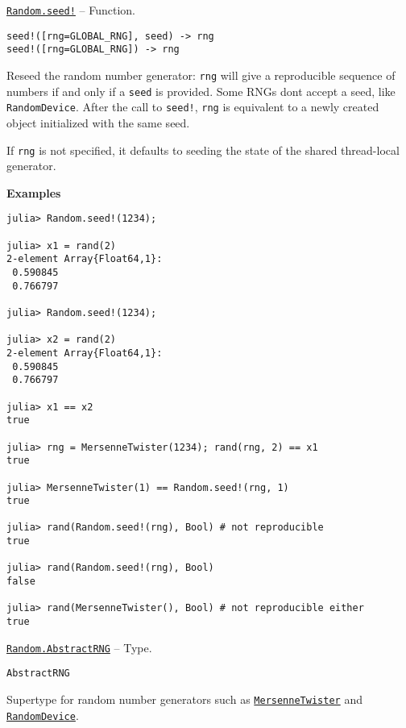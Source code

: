 \hypertarget{9373195541397142847}{}
\hyperlink{9373195541397142847}{\texttt{Random.seed!}}  -- {Function.}

\begin{adjustwidth}{2em}{0pt}


\begin{verbatim}
seed!([rng=GLOBAL_RNG], seed) -> rng
seed!([rng=GLOBAL_RNG]) -> rng
\end{verbatim}

Reseed the random number generator: \texttt{rng} will give a reproducible sequence of numbers if and only if a \texttt{seed} is provided. Some RNGs don{\textquotesingle}t accept a seed, like \texttt{RandomDevice}. After the call to \texttt{seed!}, \texttt{rng} is equivalent to a newly created object initialized with the same seed.

If \texttt{rng} is not specified, it defaults to seeding the state of the shared thread-local generator.

\textbf{Examples}


\begin{verbatim}
julia> Random.seed!(1234);

julia> x1 = rand(2)
2-element Array{Float64,1}:
 0.590845
 0.766797

julia> Random.seed!(1234);

julia> x2 = rand(2)
2-element Array{Float64,1}:
 0.590845
 0.766797

julia> x1 == x2
true

julia> rng = MersenneTwister(1234); rand(rng, 2) == x1
true

julia> MersenneTwister(1) == Random.seed!(rng, 1)
true

julia> rand(Random.seed!(rng), Bool) # not reproducible
true

julia> rand(Random.seed!(rng), Bool)
false

julia> rand(MersenneTwister(), Bool) # not reproducible either
true
\end{verbatim}



\end{adjustwidth}
\hypertarget{17421972100838426566}{}
\hyperlink{17421972100838426566}{\texttt{Random.AbstractRNG}}  -- {Type.}

\begin{adjustwidth}{2em}{0pt}


\begin{verbatim}
AbstractRNG
\end{verbatim}

Supertype for random number generators such as \hyperlink{4960058165975837552}{\texttt{MersenneTwister}} and \hyperlink{14367539717133476780}{\texttt{RandomDevice}}.



\end{adjustwidth}

